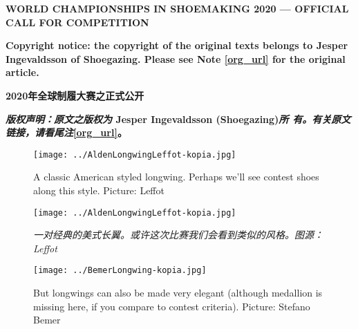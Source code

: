 \begin{paracol}{2}

    \setlength{\columnsep}{3.5em}
    \setlength{\columnseprule}{0.1pt}

    {\Large \textbf{WORLD CHAMPIONSHIPS IN SHOEMAKING 2020 --- OFFICIAL CALL FOR COMPETITION}}

    \textbf{{\tnr Copyright notice: the copyright of the original texts belongs to
    Jesper Ingevaldsson of Shoegazing. Please see Note \ref{org_url} for
    the original article.}}

    \vspace{1em}

    \switchcolumn
    {\Large \textbf{2020年全球制履大赛之正式公开}}

    \vspace{2em}

    \textbf{{\textit{版权声明：原文之版权为} {\tnr Jesper Ingevaldsson (Shoegazing)}\textit{所
    有。有关原文链接，请看尾注}\ref{org_url}。}}
    \switchcolumn*

    \begin{figure}[h]
        \centering
        \texttt{[image: ../AldenLongwingLeffot-kopia.jpg]}
        \captionsetup{labelformat=empty}
        \caption{\tnr A classic American styled longwing. Perhaps we'll see contest shoes along this style. Picture: Leffot}
        \label{}
    \end{figure}

    \switchcolumn
    \begin{figure}[h]
        \centering
        \texttt{[image: ../AldenLongwingLeffot-kopia.jpg]}
        \captionsetup{labelformat=empty}
        \caption{\textit{一对经典的美式长翼。或许这次比赛我们会看到类似的风格。图源：\textnormal{{\tnr Leffot}}}}
        \label{}
    \end{figure}
    \switchcolumn*

    \begin{figure}[h]
        \centering
        \texttt{[image: ../BemerLongwing-kopia.jpg]}
        \captionsetup{labelformat=empty}
        \caption{\tnr But longwings can also be made very elegant (although medallion is missing here, if you compare to contest criteria). Picture: Stefano Bemer}
        \label{}
    \end{figure}


\end{paracol}
